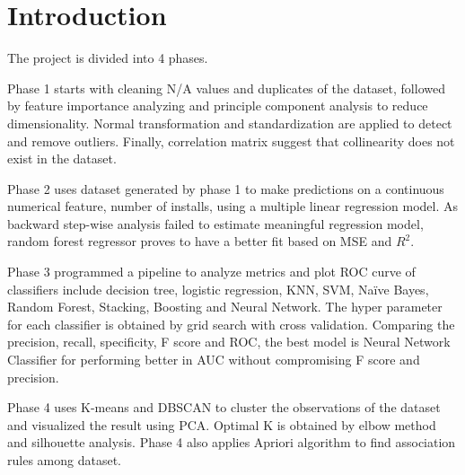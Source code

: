 \section{Introduction}
The project is divided into 4 phases.

Phase 1 starts with cleaning N/A values and duplicates of the dataset, followed by feature importance analyzing and principle component analysis to reduce dimensionality. Normal transformation and standardization are applied to detect and remove outliers. Finally, correlation matrix suggest that collinearity does not exist in the dataset.

Phase 2 uses dataset generated by phase 1 to make predictions on a continuous numerical feature, number of installs, using a multiple linear regression model. As backward step-wise analysis failed to estimate meaningful regression model, random forest regressor proves to have a better fit based on MSE and $R^2$.

Phase 3 programmed a pipeline to analyze metrics and plot ROC curve of classifiers include decision tree, logistic regression, KNN, SVM, Na\"ive Bayes, Random Forest, Stacking, Boosting and Neural Network. The hyper parameter for each classifier is obtained by grid search with cross validation. Comparing the precision, recall, specificity, F score and ROC, the best model is Neural Network Classifier for performing better in AUC without compromising F score and precision.

Phase 4 uses K-means and DBSCAN to cluster the observations of the dataset and visualized the result using PCA. Optimal K is obtained by elbow method and silhouette analysis. Phase 4 also applies Apriori algorithm to find association rules among dataset.